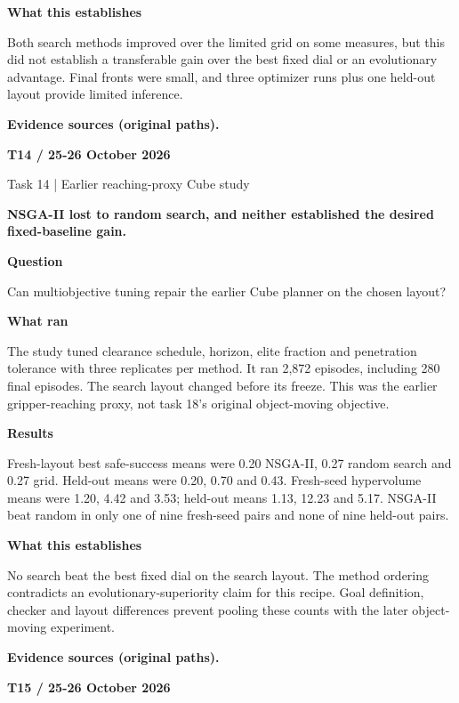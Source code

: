 \documentclass[11pt,a4paper]{article}
\newcommand{\block}[2]{\par\textbf{\color{ink}#1}\par\nopagebreak #2\par}
\newcommand{\finding}[1]{\begin{tcolorbox}[colback=pale,colframe=pale,boxrule=0pt,arc=1mm,left=10pt,right=10pt,top=10pt,bottom=10pt]\color{ink}\large\bfseries #1\end{tcolorbox}}
\begin{document}
\block{What this establishes}{Both search methods improved over the limited grid on some measures, but this did not establish a transferable gain over the best fixed dial or an evolutionary advantage. Final fronts were small, and three optimizer runs plus one held-out layout provide limited inference.}
\vfill{\footnotesize\color{muted}\textbf{Evidence sources (original paths).}\par
\raggedright {}}
\clearpage
{}\label{exp:T14}
{\color{accent}\small\bfseries T14 / 25-26 October 2026}\par
{}\par
{\color{muted}\small Task 14 | Earlier reaching-proxy Cube study}\par\vspace{2mm}
\finding{NSGA-II lost to random search, and neither established the desired fixed-baseline gain.}
\block{Question}{Can multiobjective tuning repair the earlier Cube planner on the chosen layout?}
\block{What ran}{The study tuned clearance schedule, horizon, elite fraction and penetration tolerance with three replicates per method. It ran 2,872 episodes, including 280 final episodes. The search layout changed before its freeze. This was the earlier gripper-reaching proxy, not task 18's original object-moving objective.}
\block{Results}{Fresh-layout best safe-success means were 0.20 NSGA-II, 0.27 random search and 0.27 grid. Held-out means were 0.20, 0.70 and 0.43. Fresh-seed hypervolume means were 1.20, 4.42 and 3.53; held-out means 1.13, 12.23 and 5.17. NSGA-II beat random in only one of nine fresh-seed pairs and none of nine held-out pairs.}
\block{What this establishes}{No search beat the best fixed dial on the search layout. The method ordering contradicts an evolutionary-superiority claim for this recipe. Goal definition, checker and layout differences prevent pooling these counts with the later object-moving experiment.}
\vfill{\footnotesize\color{muted}\textbf{Evidence sources (original paths).}\par
\raggedright {}}
\clearpage
{}\label{exp:T15}
{\color{accent}\small\bfseries T15 / 25-26 October 2026}\par
{}\par
\end{document}

